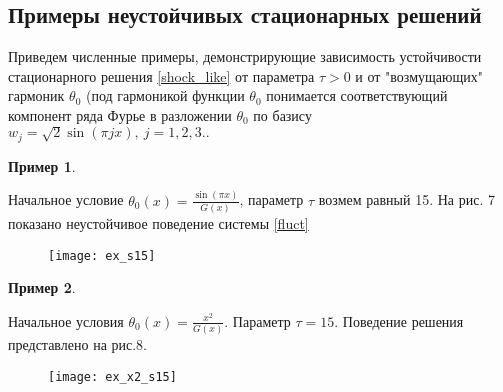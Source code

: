 \subsection{Примеры неустойчивых стационарных решений}

Приведем численные примеры, демонстрирующие зависимость устойчивости
стационарного решения \eqref{shock_like} от параметра $\tau > 0$ и от
"возмущающих" гармоник $\theta_0$ (под гармоникой функции $\theta_0$ понимается
соответствующий компонент ряда Фурье в разложении $\theta_0$ по базису $w_j =
\sqrt{2} \sin(\pi j x), \ j = 1,2,3..$

\newtheorem{exmp_bur}{Пример}
\begin{exmp_bur}
\end{exmp_bur}

Начальное условие $\theta_0(x) = \frac{\sin(\pi x)}{G(x)}$, параметр $\tau$ 
возмем равный 15. На рис. 7 показано неустойчивое поведение системы
\eqref{fluct}

\begin{figure}[H]
    \centering
    \texttt{[image: ex\_s15]}
    \caption{}
\end{figure}

\begin{exmp_bur}
\end{exmp_bur}
Начальное условия $\theta_0(x) = \frac{x^2}{G(x)}$. Параметр $\tau = 15$.
Поведение решения представлено на рис.8.

\begin{figure}[H]
    \centering
    \texttt{[image: ex\_x2\_s15]}
    \caption{}
\end{figure}
